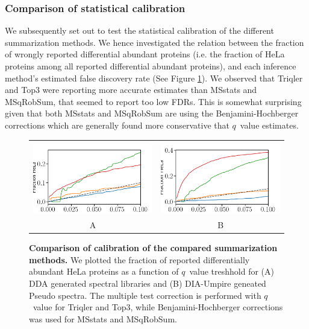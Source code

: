 \documentclass[10pt,letterpaper]{article}
\begin{document}
\subsubsection*{Comparison of statistical calibration}

We subsequently set out to test the statistical calibration of the different summarization methods. We hence investigated the relation between the fraction of wrongly reported differential abundant proteins (i.e. the fraction of HeLa proteins among all reported differential abundant proteins), and each inference method's estimated false discovery rate (See Figure \ref{fig:frac_hela_vs_fdr}). We observed that Triqler and Top3 were reporting more accurate estimates than MSstats and MSqRobSum, that seemed to report too low FDRs. This is somewhat surprising given that both MSstats and MSqRobSum are using the Benjamini-Hochberger corrections which are generally found more conservative that $q$~value estimates.

\begin{figure}[hbt]
    \centering
    \begin{tabular}{cc} 
        \includegraphics[width=0.5\linewidth]{../../result/report_plots_filtered/osw_FP_DE_all.png} & 
        \includegraphics[width=0.5\linewidth]{../../result/report_plots_filtered/diann_FP_DE_all.png} \\
        A & B
    \end{tabular}
  \caption{{\bf Comparison of calibration of the compared summarization methods.} We plotted the fraction of reported differentially abundant HeLa proteins as a function of $q$~value treshhold for (A) DDA generated spectral libraries and (B) DIA-Umpire geneated Pseudo spectra. The multiple test correction is performed with $q$~value for Triqler and Top3, while Benjamini-Hochberger corrections was used for MSstats and MSqRobSum. \label{fig:frac_hela_vs_fdr}}
\end{figure}
\end{document}
